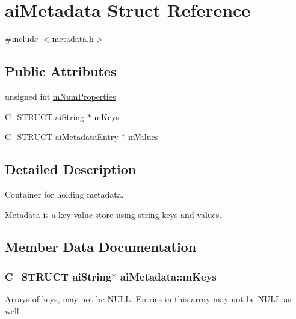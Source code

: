 \hypertarget{structai_metadata}{}\section{ai\+Metadata Struct Reference}
\label{structai_metadata}


{\ttfamily \#include $<$metadata.\+h$>$}

\subsection*{Public Attributes}
\begin{DoxyCompactItemize}
\item 
unsigned int \hyperlink{structai_metadata_a32c4587c53dd402a5878ffc94088e528}{m\+Num\+Properties}
\item 
C\+\_\+\+S\+T\+R\+U\+CT \hyperlink{structai_string}{ai\+String} $\ast$ \hyperlink{structai_metadata_aa8c77a263443658737ee51a74e3c292e}{m\+Keys}
\item 
C\+\_\+\+S\+T\+R\+U\+CT \hyperlink{structai_metadata_entry}{ai\+Metadata\+Entry} $\ast$ \hyperlink{structai_metadata_a34b515fcb5b806c471d3c6ce7bc76beb}{m\+Values}
\end{DoxyCompactItemize}


\subsection{Detailed Description}
Container for holding metadata.

Metadata is a key-\/value store using string keys and values. 

\subsection{Member Data Documentation}
\subsubsection[{\texorpdfstring{m\+Keys}{mKeys}}]{\setlength{\rightskip}{0pt plus 5cm}C\+\_\+\+S\+T\+R\+U\+CT {\bf ai\+String}$\ast$ ai\+Metadata\+::m\+Keys}\hypertarget{structai_metadata_aa8c77a263443658737ee51a74e3c292e}{}\label{structai_metadata_aa8c77a263443658737ee51a74e3c292e}
Arrays of keys, may not be N\+U\+LL. Entries in this array may not be N\+U\+LL as well. 
